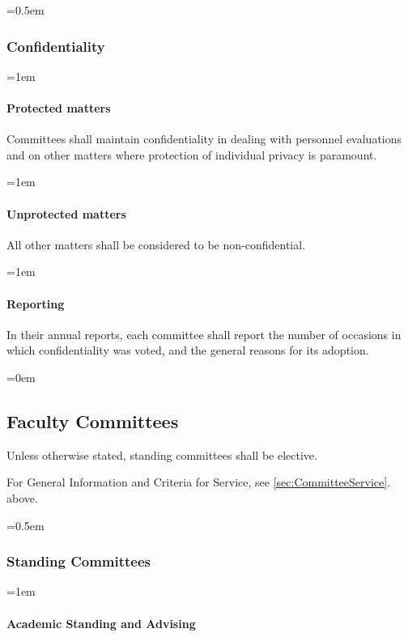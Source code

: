 \documentclass{manual}
\let\oldsubsection\subsection
\renewcommand\subsection{\leftskip=0em\oldsubsection}
\let\oldsubsubsection\subsubsection
\renewcommand\subsubsection{\leftskip=0.5em\oldsubsubsection}
\let\oldparagraph\paragraph
\renewcommand\paragraph{\leftskip=1em\oldparagraph}
\begin{document}
\subsubsection{Confidentiality}

\paragraph{Protected matters}
Committees shall maintain confidentiality in dealing with personnel evaluations and on other matters where protection of individual privacy is paramount.

\paragraph{Unprotected matters}
All other matters shall be considered to be non-confidential.

\paragraph{Reporting}
In their annual reports, each committee shall report the number of occasions in which confidentiality was voted, and the general reasons for its adoption.


\subsection{Faculty Committees} \label{sec:FacultyCommittees}
Unless otherwise stated, standing committees shall be elective.

For General Information and Criteria for Service, see \cref{sec:CommitteeService}. above.

\subsubsection{Standing Committees}\label{sub:StandingCommittees}

\paragraph{Academic Standing and Advising}
\end{document}
